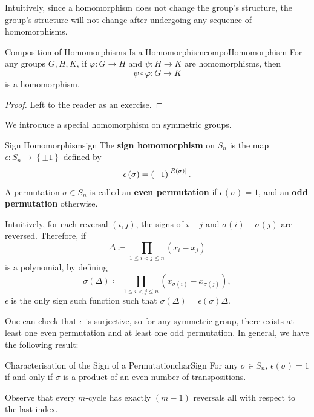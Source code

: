 \documentclass[math]{amznotes}
\theoremstyle{remark}
\newcommand{\0}{\mathbf{0}}
\newcommand{\1}{\mathbf{1}}
\begin{document}
Intuitively, since a homomorphism does not change the group's structure, the group's structure will not change after undergoing any sequence of homomorphisms.
\begin{probox}{Composition of Homomorphisms Is a Homomorphism}{compoHomomorphism}
    For any groups $G, H, K$, if $\varphi \colon G \to H$ and $\psi \colon H \to K$ are homomorphisms, then
    \begin{equation*}
        \psi \circ \varphi \colon G \to K
    \end{equation*}
    is a homomorphism.
    \tcblower
    \begin{proof}
        Left to the reader as an exercise.
    \end{proof}
\end{probox}
We introduce a special homomorphism on symmetric groups.
\begin{dfnbox}{Sign Homomorphism}{sign}
    The {\color{red} \textbf{sign homomorphism}} on $S_n$ is the map $\epsilon \colon S_n \to \left\{\pm 1\right\}$ defined by 
    \begin{equation*}
        \epsilon\left(\sigma\right) = \left(-1\right)^{{\left\lvert {R\left(\sigma\right)} \right\rvert}}.
    \end{equation*}
    A permutation $\sigma \in S_n$ is called an {\color{red} \textbf{even permutation}} if $\epsilon\left(\sigma\right) = 1$, and an {\color{red} \textbf{odd permutation}} otherwise.
\end{dfnbox}
Intuitively, for each reversal $\left(i, j\right)$, the signs of $i - j$ and $\sigma\left(i\right) - \sigma\left(j\right)$ are reversed. Therefore, if 
\begin{equation*}
    \Delta \coloneqq \prod_{1 \leq i < j \leq n}\left(x_i - x_j\right)
\end{equation*}
is a polynomial, by defining 
\begin{equation*}
    \sigma\left(\Delta\right) \coloneqq \prod_{1 \leq i < j \leq n}\left(x_{\sigma\left(i\right)} - x_{\sigma\left(j\right)}\right),
\end{equation*}
$\epsilon$ is the only sign such function such that $\sigma\left(\Delta\right) = \epsilon\left(\sigma\right)\Delta$.

One can check that $\epsilon$ is surjective, so for any symmetric group, there exists at least one even permutation and at least one odd permutation. In general, we have the following result:
\begin{corbox}{Characterisation of the Sign of a Permutation}{charSign}
    For any $\sigma\in S_n$, $\epsilon\left(\sigma\right) = 1$ if and only if $\sigma$ is a product of an even number of transpositions.
\end{corbox}
Observe that every $m$-cycle has exactly $\left(m - 1\right)$ reversals all with respect to the last index.
\end{document}
